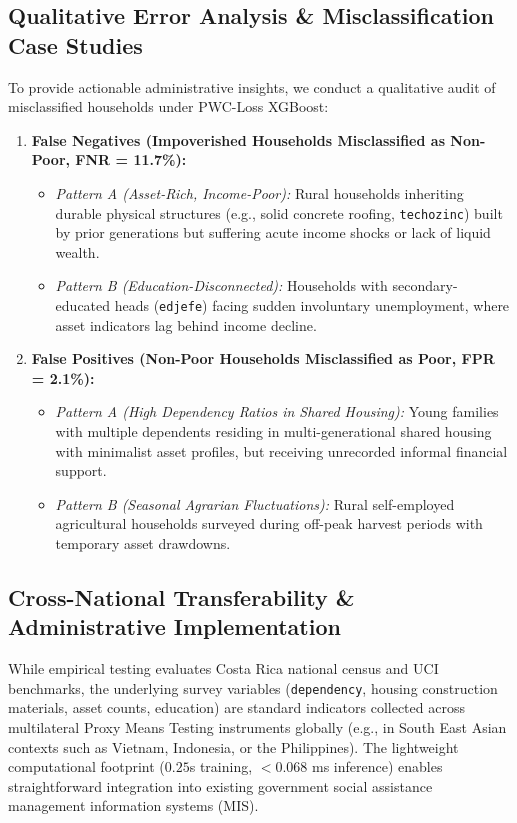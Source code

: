\documentclass[conference]{IEEEtran}
\begin{document}
\subsection{Qualitative Error Analysis & Misclassification Case Studies}
To provide actionable administrative insights, we conduct a qualitative audit of misclassified households under PWC-Loss XGBoost:
\begin{enumerate}
\item \textbf{False Negatives (Impoverished Households Misclassified as Non-Poor, FNR = 11.7\%):}
  \begin{itemize}
  \item \textit{Pattern A (Asset-Rich, Income-Poor):} Rural households inheriting durable physical structures (e.g., solid concrete roofing, \texttt{techozinc}) built by prior generations but suffering acute income shocks or lack of liquid wealth.
  \item \textit{Pattern B (Education-Disconnected):} Households with secondary-educated heads (\texttt{edjefe}) facing sudden involuntary unemployment, where asset indicators lag behind income decline.
  \end{itemize}
\item \textbf{False Positives (Non-Poor Households Misclassified as Poor, FPR = 2.1\%):}
  \begin{itemize}
  \item \textit{Pattern A (High Dependency Ratios in Shared Housing):} Young families with multiple dependents residing in multi-generational shared housing with minimalist asset profiles, but receiving unrecorded informal financial support.
  \item \textit{Pattern B (Seasonal Agrarian Fluctuations):} Rural self-employed agricultural households surveyed during off-peak harvest periods with temporary asset drawdowns.
  \end{itemize}
\end{enumerate}

\subsection{Cross-National Transferability & Administrative Implementation}
While empirical testing evaluates Costa Rica national census and UCI benchmarks, the underlying survey variables (\texttt{dependency}, housing construction materials, asset counts, education) are standard indicators collected across multilateral Proxy Means Testing instruments globally (e.g., in South East Asian contexts such as Vietnam, Indonesia, or the Philippines). The lightweight computational footprint ($0.25$s training, $<0.068$ ms inference) enables straightforward integration into existing government social assistance management information systems (MIS).
\end{document}
